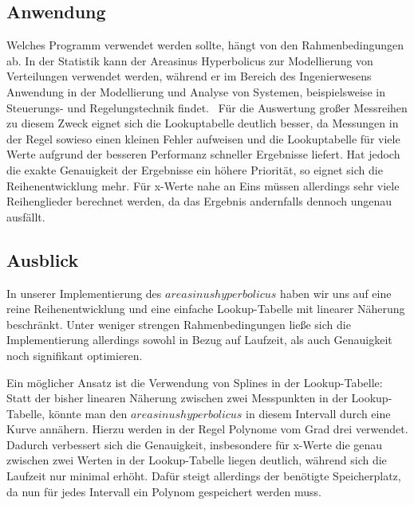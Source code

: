 \documentclass[course=erap] {aspdoc}
\begin{document}
    
    \subsection{Anwendung}
    Welches Programm verwendet werden sollte, hängt von den Rahmenbedingungen ab.
    In der Statistik kann der Areasinus Hyperbolicus zur Modellierung von Verteilungen verwendet werden, während er im Bereich des Ingenierwesens
    Anwendung in der Modellierung und Analyse von Systemen, beispielsweise in Steuerungs- und Regelungstechnik findet.~\cite{TODO}
    Für die Auswertung großer Messreihen zu diesem Zweck eignet sich die Lookuptabelle deutlich besser, da Messungen in der Regel sowieso einen kleinen Fehler aufweisen und die Lookuptabelle für viele Werte aufgrund der besseren Performanz schneller Ergebnisse liefert.
    Hat jedoch die exakte Genauigkeit der Ergebnisse ein höhere Priorität, so eignet sich die Reihenentwicklung mehr.
    Für x-Werte nahe an Eins müssen allerdings sehr viele Reihenglieder berechnet werden, da das Ergebnis andernfalls dennoch ungenau ausfällt.

    \subsection{Ausblick}

    In unserer Implementierung des $areasinus hyperbolicus$ haben wir uns auf eine reine Reihenentwicklung und eine einfache Lookup-Tabelle mit linearer Näherung beschränkt.
    Unter weniger strengen Rahmenbedingungen ließe sich die Implementierung allerdings sowohl in Bezug auf Laufzeit, als auch Genauigkeit noch signifikant optimieren. 
    
    Ein möglicher Ansatz ist die Verwendung von Splines in der Lookup-Tabelle: Statt der bisher linearen Näherung zwischen zwei Messpunkten in der Lookup-Tabelle, könnte man den $areasinus hyperbolicus$ in diesem Intervall durch eine Kurve annähern.
    Hierzu werden in der Regel Polynome vom Grad drei verwendet.
    Dadurch verbessert sich die Genauigkeit, insbesondere für x-Werte die genau zwischen zwei Werten in der Lookup-Tabelle liegen deutlich, während sich die Laufzeit nur minimal erhöht.
    Dafür steigt allerdings der benötigte Speicherplatz, da nun für jedes Intervall ein Polynom gespeichert werden muss.
\end{document}
